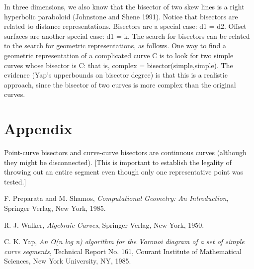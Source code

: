 In three dimensions, we also know that the bisector of two skew lines
is a right hyperbolic paraboloid (Johnstone and Shene 1991).
Notice that bisectors are related to distance representations.
Bisectors are a special case: d1 = d2.
Offset surfaces are another special case: d1 = k.
The search for bisectors can be related to the search for 
geometric representations, as follows.
One way to find a geometric representation 
of a complicated curve C is to look for two simple curves whose bisector is C: 
that is, complex = bisector(simple,simple).
The evidence (Yap's upperbounds on bisector degree) is that 
this is a realistic approach, since the bisector of two curves 
is more complex than the original curves.

\section{Appendix}

\begin{lemma}
Point-curve bisectors and curve-curve bisectors are continuous curves
(although they might be disconnected).
[This is important to establish the legality of throwing out an entire segment even though
only one representative point was tested.]
\end{lemma}

\begin{thebibliography}{The longest}

F. Preparata and M. Shamos,
{\em Computational Geometry: An Introduction}, 
Springer Verlag, New York, 1985.

R. J. Walker,
{\em Algebraic Curves},
Springer Verlag, New York, 1950.

C. K. Yap, 
{\em An O(n log n) algorithm for the Voronoi diagram of a set of simple curve segments},
Technical Report No. 161, Courant Institute of Mathematical Sciences, New York University,
NY, 1985.

\end{thebibliography}


